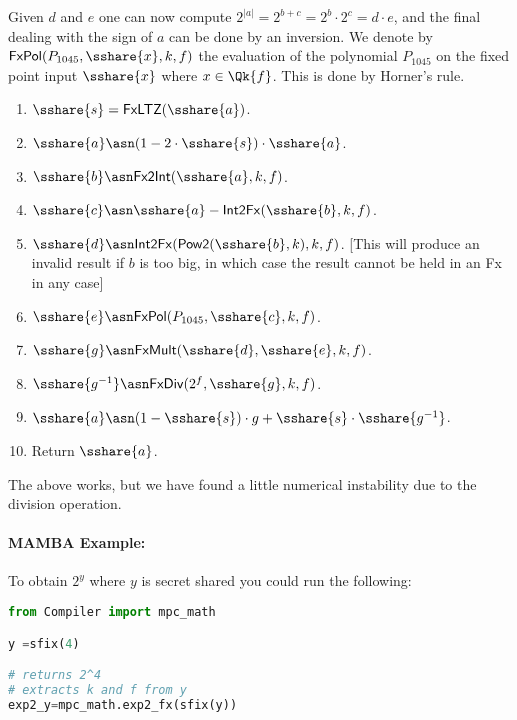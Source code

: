   Given $d$ and $e$ one can now compute
$2^{|a|}=2^{b+c}=2^b \cdot 2^c=d \cdot e$,
  and the final dealing with the sign of $a$ can
  be done by an inversion.
  We denote by $\mathsf{FxPol}(P_{1045},\sshare{x},k,f)$ the evaluation
  of the polynomial $P_{1045}$ on the fixed point input $\sshare{x}$
  where $x \in \Qk{f}$. This is done by Horner's rule.
  \begin{enumerate}
    \item $\sshare{s}=\mathsf{FxLTZ}(\sshare{a})$.
    \item $\sshare{a} \asn (1-2 \cdot \sshare{s}) \cdot \sshare{a}$.
    \item $\sshare{b} \asn \mathsf{Fx2Int}(\sshare{a},k,f)$.
    \item $\sshare{c} \asn \sshare{a}-\mathsf{Int2Fx}(\sshare{b},k,f)$.
    \item $\sshare{d} \asn \mathsf{Int2Fx}(\mathsf{Pow2}(\sshare{b},k),k,f)$. [This will produce an invalid result if $b$ is too big, in which case the result cannot be held in an Fx in any case]
    \item $\sshare{e} \asn \mathsf{FxPol}(P_{1045},\sshare{c},k,f)$.
    \item $\sshare{g} \asn \mathsf{FxMult}(\sshare{d},\sshare{e},k,f)$.
    \item $\sshare{g^{-1}} \asn \mathsf{FxDiv}(2^f,\sshare{g},k,f)$.
    \item $\sshare{a} \asn (1-\sshare{s}) \cdot g+ \sshare{s} \cdot \sshare{g^{-1}}$.
    \item Return $\sshare{a}$.
  \end{enumerate}
  The above works, but we have found a little numerical
  instability due to the division operation.
  \paragraph{MAMBA Example:} To obtain $2^y$ where $y$ is secret shared you could run the following:
  \begin{lstlisting}[language={python}]
from Compiler import mpc_math

y =sfix(4)

# returns 2^4
# extracts k and f from y
exp2_y=mpc_math.exp2_fx(sfix(y))
\end{lstlisting}

